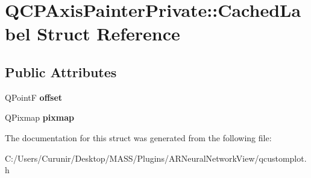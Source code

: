 \hypertarget{struct_q_c_p_axis_painter_private_1_1_cached_label}{}\section{Q\+C\+P\+Axis\+Painter\+Private\+:\+:Cached\+Label Struct Reference}
\label{struct_q_c_p_axis_painter_private_1_1_cached_label}
\subsection*{Public Attributes}
\begin{DoxyCompactItemize}
\item 
\mbox{\label{struct_q_c_p_axis_painter_private_1_1_cached_label_a5f502db71c92e572f1e6f44f62c59d8e}} 
Q\+PointF {\bfseries offset}
\item 
\mbox{\label{struct_q_c_p_axis_painter_private_1_1_cached_label_a461597cbd470914a9d24b64d16037a88}} 
Q\+Pixmap {\bfseries pixmap}
\end{DoxyCompactItemize}


The documentation for this struct was generated from the following file\+:\begin{DoxyCompactItemize}
\item 
C\+:/\+Users/\+Curunir/\+Desktop/\+M\+A\+S\+S/\+Plugins/\+A\+R\+Neural\+Network\+View/qcustomplot.\+h\end{DoxyCompactItemize}
